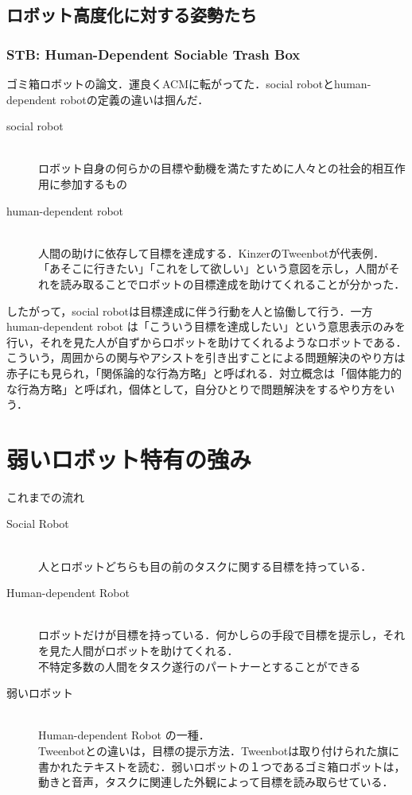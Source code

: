 \documentclass[twocolumn]{mynote}
\begin{document}
\subsection*{ロボット高度化に対する姿勢たち}
\subsubsection*{STB: Human-Dependent Sociable Trash Box}
ゴミ箱ロボットの論文\cite{岡田美智男-2012-ゴミ箱ロ}．運良くACMに転がってた．social robotとhuman-dependent robotの定義の違いは掴んだ．

\begin{description}
  \item[social robot]\mbox{}\\
    ロボット自身の何らかの目標や動機を満たすために人々との社会的相互作用に参加するもの
  \item[human-dependent robot]\mbox{}\\
    人間の助けに依存して目標を達成する．KinzerのTweenbotが代表例．\\
    「あそこに行きたい」「これをして欲しい」という意図を示し，人間がそれを読み取ることでロボットの目標達成を助けてくれることが分かった．
\end{description}

したがって，social robotは目標達成に伴う行動を人と協働して行う．一方human-dependent robot は「こういう目標を達成したい」という意思表示のみを行い，それを見た人が自ずからロボットを助けてくれるようなロボットである\cite{Yamaji-2010-STBHumandependentSociableTrash}．こういう，周囲からの関与やアシストを引き出すことによる問題解決のやり方は赤子にも見られ，「関係論的な行為方略」と呼ばれる\cite{岡田美智男-2012-ゴミ箱ロ}．対立概念は「個体能力的な行為方略」と呼ばれ，個体として，自分ひとりで問題解決をするやり方をいう．

\section*{弱いロボット特有の強み}
これまでの流れ
\begin{description}
  \item[Social Robot]\mbox{}\\
    人とロボットどちらも目の前のタスクに関する目標を持っている\cite{Breazeal-2004-SocialInteractionsHRIRobot}．
  \item[Human-dependent Robot]\mbox{}\\
    ロボットだけが目標を持っている．何かしらの手段で目標を提示し，それを見た人間がロボットを助けてくれる．\\
    \Rightarrow 不特定多数の人間をタスク遂行のパートナーとすることができる\cite{--TweenbotsKacieKinzer}
  \item[弱いロボット]\mbox{}\\
    Human-dependent Robot の一種． \\
    Tweenbotとの違いは，目標の提示方法．Tweenbotは取り付けられた旗に書かれたテキストを読む．弱いロボットの１つであるゴミ箱ロボットは，動きと音声，タスクに関連した外観によって目標を読み取らせている．\\
\end{description}
\end{document}

